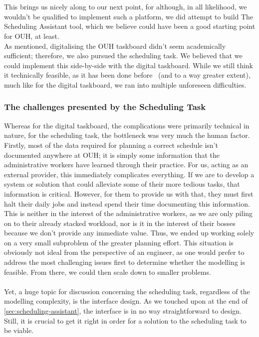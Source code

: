 \\
\\
This brings us nicely along to our next point, for although, in all likelihood, we wouldn't be qualified to implement such a platform, we did attempt to build The Scheduling Assistant tool, which we believe could have been a good starting point for OUH, at least.
\\
As mentioned, digitalising the OUH taskboard didn't seem academically sufficient; therefore, we also pursued the scheduling task. We believed that we could implement this side-by-side with the digital taskboard. While we still think it technically feasible, as it has been done before~\cite{you-but-better} (and to a way greater extent), much like for the digital taskboard, we ran into multiple unforeseen difficulties.

\subsubsection*{The challenges presented by the Scheduling Task}
Whereas for the digital taskboard, the complications were primarily technical in nature, for the scheduling task, the bottleneck was very much the human factor.
\\
Firstly, most of the data required for planning a correct schedule isn't documented anywhere at OUH; it is simply some information that the administrative workers have learned through their practice. For us, acting as an external provider, this immediately complicates everything. If we are to develop a system or solution that could alleviate some of their more tedious tasks, that information is critical. However, for them to provide us with that, they must first halt their daily jobs and instead spend their time documenting this information. This is neither in the interest of the administrative workers, as we are only piling on to their already stacked workload, nor is it in the interest of their bosses because we don't provide any immediate value. Thus, we ended up working solely on a very small subproblem of the greater planning effort. This situation is obviously not ideal from the perspective of an engineer, as one would prefer to address the most challenging issues first to determine whether the modelling is feasible. From there, we could then scale down to smaller problems.
\\
\\
Yet, a huge topic for discussion concerning the scheduling task, regardless of the modelling complexity, is the interface design. As we touched upon at the end of \autoref{sec:scheduling-assistant}, the interface is in no way straightforward to design. Still, it is crucial to get it right in order for a solution to the scheduling task to be viable. 
